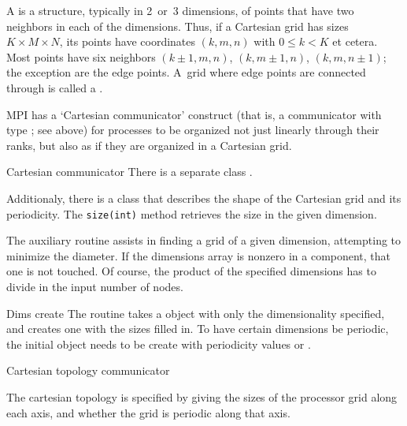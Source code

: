A  is a structure, typically in 2~or~3 dimensions,
of points that have two neighbors in each of the dimensions.
Thus, if a Cartesian grid has sizes $K\times M\times N$, its
points have coordinates $(k,m,n)$ with $0\leq k<K$ et cetera.
Most points have six neighbors $(k\pm1,m,n)$, $(k,m\pm1,n)$, $(k,m,n\pm1)$;
the exception are the edge points. A~grid where edge points
are connected through  is called
a .

MPI has a `Cartesian communicator' construct
(that is, a communicator with type ;
see above)
for processes to be organized not just linearly
through their ranks,
but also as if they are organized in a Cartesian grid.

\begin{mplnote}{Cartesian communicator}
  There is a separate class .
  
  Additionaly, there is a class 
  that describes the shape of the Cartesian grid
  and its periodicity.
  The \lstinline{size(int)} method retrieves the size
  in the given dimension.
\end{mplnote}

The auxiliary routine 
assists in finding a grid of a given dimension,
attempting to minimize the diameter.
%
{
  \def\snippetcodefraction{.45}
  \def\snippetlistfraction{.55}
  }
%
If the dimensions array is nonzero in a component, that one is not touched. 
Of course, the product of the specified dimensions has to divide in
the input number of nodes.

\begin{mplnote}{Dims create}
  The  routine takes a 
  object with only the dimensionality specified, and creates one
  with the sizes filled in.
  To have certain dimensions be periodic,
  the initial  object needs to be
  create with periodicity values  or .
\end{mplnote}

 {Cartesian topology communicator}
\label{sec:cart-comm-create}

The cartesian topology is specified by giving
 the sizes of the processor grid along
each axis, and whether the grid is periodic along that axis.

